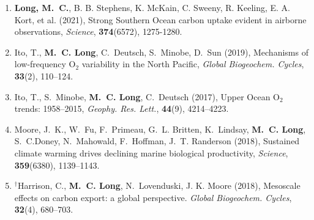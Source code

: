 \documentclass[12pt]{article}
\begin{document}
\begin{enumerate}[leftmargin=1.5em,font=\normalfont]
\setlength{\itemsep}{-0.2em}

\item
\textbf{{Long}, M.~C.}, B. B. Stephens, K. McKain, C. Sweeny, R. Keeling, E. A. Kort, et al.
(2021), Strong Southern Ocean carbon uptake evident in airborne observations, \textit{Science},
\textbf{374}(6572), {1275-1280}.

\item
Ito, T., \textbf{M.~C. Long}, C.~Deutsch, S.~Minobe, D.~Sun (2019), Mechanisms of low-frequency O$_2$ variability in the North Pacific, \textit{Global Biogeochem. Cycles}, \textbf{33}(2), 110--124.

\item
Ito, T., S.~Minobe, \textbf{M.~C. Long}, C.~Deutsch (2017), {Upper Ocean O$_2$ trends: 1958--2015}, \textit{Geophy. Res. Lett.}, \textbf{44}(9), 4214--4223.

\item
Moore, J.~K., W.~Fu, F.~Primeau, G.~L. Britten, K.~Lindsay, \textbf{M.~C. Long},
S.~C.Doney, N.~Mahowald, F.~Hoffman, J.~T. Randerson
(2018), Sustained climate warming drives declining marine biological productivity, \textit{Science}, \textbf{359}(6380), 1139--1143.

\item
$^\dagger$Harrison, C., \textbf{M.~C. Long}, N.~{Lovenduski}, J. K. Moore (2018), {Mesoscale effects on carbon export: a global perspective}. \textit{Global Biogeochem. Cycles}, \textbf{32}(4), 680--703.
\end{enumerate}
\end{document}
